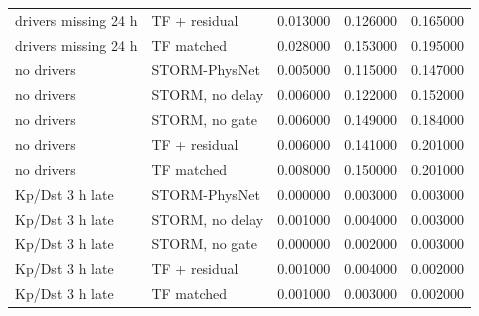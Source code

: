 \begin{tabular}{llrrr}
drivers missing 24 h & TF + residual & 0.013000 & 0.126000 & 0.165000 \\
drivers missing 24 h & TF matched & 0.028000 & 0.153000 & 0.195000 \\
no drivers & STORM-PhysNet & 0.005000 & 0.115000 & 0.147000 \\
no drivers & STORM, no delay & 0.006000 & 0.122000 & 0.152000 \\
no drivers & STORM, no gate & 0.006000 & 0.149000 & 0.184000 \\
no drivers & TF + residual & 0.006000 & 0.141000 & 0.201000 \\
no drivers & TF matched & 0.008000 & 0.150000 & 0.201000 \\
Kp/Dst 3 h late & STORM-PhysNet & 0.000000 & 0.003000 & 0.003000 \\
Kp/Dst 3 h late & STORM, no delay & 0.001000 & 0.004000 & 0.003000 \\
Kp/Dst 3 h late & STORM, no gate & 0.000000 & 0.002000 & 0.003000 \\
Kp/Dst 3 h late & TF + residual & 0.001000 & 0.004000 & 0.002000 \\
Kp/Dst 3 h late & TF matched & 0.001000 & 0.003000 & 0.002000 \\
\bottomrule
\end{tabular}
